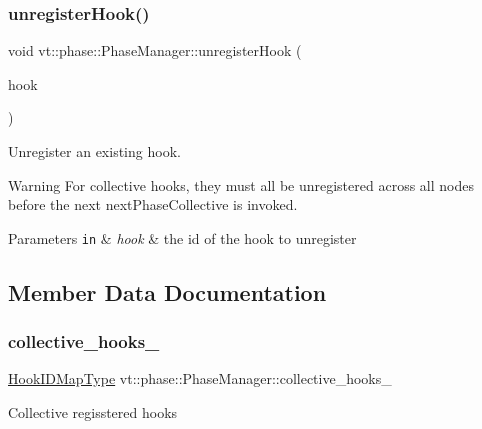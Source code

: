\subsubsection{\texorpdfstring{unregister\+Hook()}{unregisterHook()}}
{\footnotesize\ttfamily void vt\+::phase\+::\+Phase\+Manager\+::unregister\+Hook (\begin{DoxyParamCaption}\item[{\hyperlink{structvt_1_1phase_1_1_phase_hook_i_d}{Phase\+Hook\+ID}}]{hook }\end{DoxyParamCaption})}



Unregister an existing hook. 

\begin{DoxyWarning}{Warning}
For collective hooks, they must all be unregistered across all nodes before the next {\ttfamily next\+Phase\+Collective} is invoked.
\end{DoxyWarning}

\begin{DoxyParams}[1]{Parameters}
\mbox{\tt in}  & {\em hook} & the id of the hook to unregister \\
\hline
\end{DoxyParams}


\subsection{Member Data Documentation}
\mbox{\label{structvt_1_1phase_1_1_phase_manager_aafc873771fb849243f082cba71f36672}} 
\subsubsection{\texorpdfstring{collective\+\_\+hooks\+\_\+}{collective\_hooks\_}}
{\footnotesize\ttfamily \hyperlink{structvt_1_1phase_1_1_phase_manager_a7f9784fa7550beaa1e7d59e639169a8b}{Hook\+I\+D\+Map\+Type} vt\+::phase\+::\+Phase\+Manager\+::collective\+\_\+hooks\+\_\+\hspace{0.3cm}{\ttfamily [private]}}

Collective regisstered hooks \mbox{\label{structvt_1_1phase_1_1_phase_manager_a481f6b2da9da107b31d6ce8d970c7aff}} 
